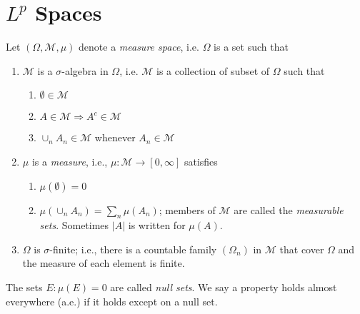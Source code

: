 \section{$L^p$ Spaces}

Let $ ( \Omega, \mathcal{M}, \mu) $ denote a \textit{measure space}, i.e. $ \Omega $ is a set such that
\begin{enumerate}
	\item $ \mathcal{M} $ is a $  \sigma $-algebra in $ \Omega $, i.e. $ \mathcal{M} $ is a collection of subset of $ \Omega $ such that
		\begin{enumerate}
			\item $ \emptyset \in \mathcal{M} $ 
			\item $ A \in \mathcal{M} \Rightarrow A^{c} \in \mathcal{M}$ 
			\item $ \cup_{n} A_{n} \in \mathcal{M}$ whenever $ A_{n} \in \mathcal{M} $
		\end{enumerate}
	\item $ \mu $ is a \textit{measure}, i.e., $ \mu: \mathcal{M} \to [0, \infty] $ satisfies
		\begin{enumerate}
			\item $ \mu( \emptyset) = 0 $
			\item $ \mu \left( \cup_{n} A_{n} \right) = \sum_{n} \mu(A_{n}) $; members of $ \mathcal{M} $ are called the \textit{measurable sets}. Sometimes $ \vert A \vert $ is written for $ \mu(A) $.
		\end{enumerate}
	\item $ \Omega $ is $ \sigma $-finite; i.e., there is a countable family $ ( \Omega_{n}) $ in $ \mathcal{M} $ that cover $ \Omega $ and the measure of each element is finite.
\end{enumerate}

The sets $ E: \mu(E) = 0 $ are called \textit{null sets}. We say a property holds almost everywhere (a.e.) if it holds except on a null set.
